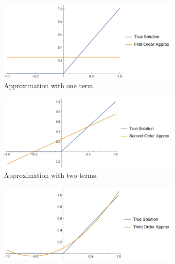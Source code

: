 \documentclass[12pt]{report}
\begin{document}
\begin{solution}
    \begin{figure}[H]
        \begin{subfigure}[b]{0.5\linewidth}
            \centering
            \includegraphics[width=\linewidth]{images/3-1.png}
            \caption{Approximation with one term.}
            \label{fig1:a}
            \vspace{4ex}
        \end{subfigure}%
        \begin{subfigure}[b]{0.5\linewidth}
            \centering
            \includegraphics[width=\linewidth]{images/3-2.png}
            \caption{Approximation with two terms.}
            \label{fig1:b}
            \vspace{4ex}
        \end{subfigure}
        \begin{subfigure}[b]{0.5\linewidth}
            \centering
            \includegraphics[width=\linewidth]{images/3-3.png}

\end{subfigure}
\end{figure}
\end{solution}
\end{document}
